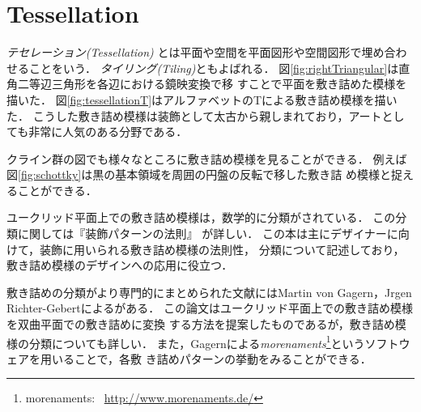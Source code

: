 
\section{Tessellation}

\emph{テセレーション}{\it (Tessellation)}
とは平面や空間を平面図形や空間図形で埋め合わせることをいう．
\emph{タイリング}{\it(Tiling)}ともよばれる．
図\ref{fig:rightTriangular}は直角二等辺三角形を各辺における鏡映変換で移
すことで平面を敷き詰めた模様を描いた．
図\ref{fig:tessellationT}はアルファベットのTによる敷き詰め模様を描いた．
こうした敷き詰め模様は装飾として太古から親しまれており，アートとしても非常に人気のある分野である．

クライン群の図でも様々なところに敷き詰め模様を見ることができる．
例えば図\ref{fig:schottky}は黒の基本領域を周囲の円盤の反転で移した敷き詰
め模様と捉えることができる．

ユークリッド平面上での敷き詰め模様は，数学的に分類がされている．
この分類に関しては『装飾パターンの法則』
\cite{fujitaｰ201507pattern}が詳しい．
この本は主にデザイナーに向けて，装飾に用いられる敷き詰め模様の法則性，
分類について記述しており，敷き詰め模様のデザインへの応用に役立つ．

敷き詰めの分類がより専門的にまとめられた文献にはMartin von Gagern，Jrgen
Richter-Gebertによる\cite{journals/combinatorics/GagernR09}がある．
この論文はユークリッド平面上での敷き詰め模様を双曲平面での敷き詰めに変換
する方法を提案したものであるが，敷き詰め模様の分類についても詳しい．
また，Gagernによる\emph{morenaments}\footnote{morenaments:~
\url{http://www.morenaments.de/}}というソフトウェアを用いることで，各敷
き詰めパターンの挙動をみることができる．

